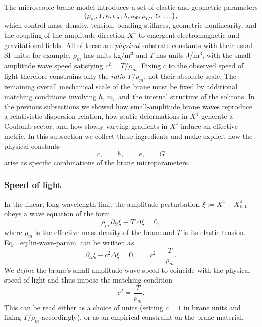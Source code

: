 The microscopic brane model introduces a set of elastic and geometric parameters
%
\begin{equation}
  \bigl\{\rho_m, T, \kappa, \epsilon_{\mathrm{cr}}, \lambda, \kappa_{\Phi}, \mu_G, \ell_\ast, \dots \bigr\},
\end{equation}
%
which control mass density, tension, bending stiffness, geometric nonlinearity, and the coupling of the amplitude direction $X^4$ to emergent electromagnetic and gravitational fields.
All of these are \emph{physical} substrate constants with their usual SI units:
for example, $\rho_m$ has units kg/m$^3$ and $T$ has units J/m$^3$, with the
small-amplitude wave speed satisfying $c^2 = T/\rho_m$. Fixing $c$ to the
observed speed of light therefore constrains only the \emph{ratio} $T/\rho_m$,
not their absolute scale. The remaining overall mechanical scale of the brane
must be fixed by additional matching conditions involving $\hbar$, $m_e$ and
the internal structure of the solitons.
In the previous subsections we showed how small-amplitude brane waves reproduce a relativistic dispersion relation, how static deformations in $X^4$ generate a Coulomb sector, and how slowly varying gradients in $X^4$ induce an effective metric.
In this subsection we collect these ingredients and make explicit how the physical constants
%
\begin{equation}
  c, \qquad \hbar, \qquad e, \qquad G
\end{equation}
%
arise as specific combinations of the brane microparameters.

\subsubsection{Speed of light}

In the linear, long-wavelength limit the amplitude perturbation
\(
  \xi := X^4 - X^4_{\mathrm{flat}}
\)
obeys a wave equation of the form
%
\begin{equation}
  \rho_m \,\partial_{tt} \xi - T \,\Delta \xi = 0,
  \label{eq:lin-wave-param}
\end{equation}
%
where $\rho_m$ is the effective mass density of the brane and $T$ is its elastic tension.
Eq.~\eqref{eq:lin-wave-param} can be written as
%
\begin{equation}
  \partial_{tt} \xi - c^2 \Delta \xi = 0,
  \qquad
  c^2 = \frac{T}{\rho_m}.
  \label{eq:c-from-brane}
\end{equation}
%
We \emph{define} the brane's small-amplitude wave speed to coincide with the physical speed of light and thus impose the matching condition
%
\begin{equation}
  c^2 = \frac{T}{\rho_m}.
  \label{eq:c-matching}
\end{equation}
%
This can be read either as a choice of units (setting $c=1$ in brane units and fixing $T/\rho_m$ accordingly), or as an empirical constraint on the brane material.

